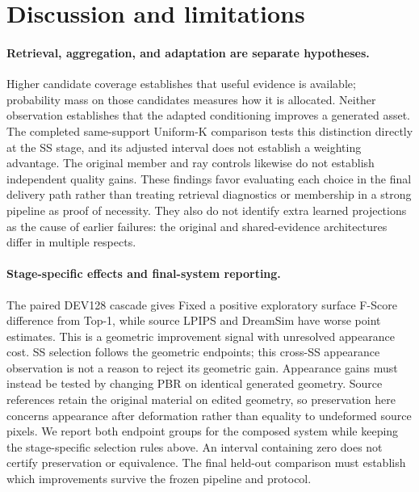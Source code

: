 \documentclass[10pt]{article}
\begin{document}
\section{Discussion and limitations}
\paragraph{Retrieval, aggregation, and adaptation are separate hypotheses.}
Higher candidate coverage establishes that useful evidence is available;
probability mass on those candidates measures how it is allocated. Neither
observation establishes that the adapted conditioning improves a generated
asset. The completed same-support Uniform-K comparison tests this distinction
directly at the SS stage, and its adjusted interval does not establish a
weighting advantage. The original member and ray controls likewise do not
establish independent quality gains. These findings favor evaluating each
choice in the final delivery path rather than treating retrieval diagnostics
or membership in a strong pipeline as proof of necessity. They also do not
identify extra learned projections as the cause of earlier failures: the
original and shared-evidence architectures differ in multiple respects.

\paragraph{Stage-specific effects and final-system reporting.}
The paired DEV128 cascade gives Fixed a positive exploratory surface F-Score
difference from Top-1, while source LPIPS and DreamSim have worse point
estimates. This is a geometric improvement signal with unresolved appearance
cost. SS selection follows the geometric endpoints; this cross-SS appearance
observation is not a reason to reject its geometric gain. Appearance gains
must instead be tested by changing PBR on identical generated geometry.
Source references retain the
original material on edited geometry, so preservation here concerns
appearance after deformation rather than equality to undeformed source
pixels. We report both endpoint groups for the composed system while
keeping the stage-specific selection rules above. An interval containing
zero does not certify preservation or equivalence.
The final held-out comparison must establish which improvements survive
the frozen pipeline and protocol.
\end{document}
